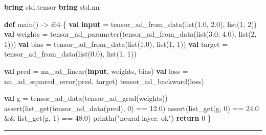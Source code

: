 \documentclass[
  english,
  oneside]{book}
\newenvironment{Shaded}{\begin{snugshade}}{\end{snugshade}}
\newcommand{\ControlFlowTok}[1]{\textcolor[rgb]{0.77,0.53,0.75}{\textbf{#1}}}
\newcommand{\DataTypeTok}[1]{\textcolor[rgb]{0.31,0.79,0.69}{#1}}
\newcommand{\DecValTok}[1]{\textcolor[rgb]{0.71,0.81,0.66}{#1}}
\newcommand{\FloatTok}[1]{\textcolor[rgb]{0.71,0.81,0.66}{#1}}
\newcommand{\FunctionTok}[1]{\textcolor[rgb]{0.86,0.86,0.67}{#1}}
\newcommand{\KeywordTok}[1]{\textcolor[rgb]{0.34,0.61,0.84}{\textbf{#1}}}
\newcommand{\NormalTok}[1]{\textcolor[rgb]{0.83,0.83,0.83}{#1}}
\newcommand{\OperatorTok}[1]{\textcolor[rgb]{0.83,0.83,0.83}{#1}}
\newcommand{\StringTok}[1]{\textcolor[rgb]{0.81,0.57,0.47}{#1}}
\begin{document}
\begin{Shaded}
\begin{Highlighting}[]
\KeywordTok{bring}\NormalTok{ std}\OperatorTok{.}\DataTypeTok{tensor}
\KeywordTok{bring}\NormalTok{ std}\OperatorTok{.}\NormalTok{nn}

\KeywordTok{def}\NormalTok{ main() }\OperatorTok{{-}\textgreater{}} \DataTypeTok{i64}\NormalTok{ \{}
    \KeywordTok{val} \KeywordTok{input} \OperatorTok{=}\NormalTok{ tensor\_ad\_from\_data(}\DataTypeTok{list}\NormalTok{(}\FloatTok{1.0}\NormalTok{, }\FloatTok{2.0}\NormalTok{), }\DataTypeTok{list}\NormalTok{(}\DecValTok{1}\NormalTok{, }\DecValTok{2}\NormalTok{))}
    \KeywordTok{val}\NormalTok{ weights }\OperatorTok{=}\NormalTok{ tensor\_ad\_parameter(tensor\_ad\_from\_data(}\DataTypeTok{list}\NormalTok{(}\FloatTok{3.0}\NormalTok{, }\FloatTok{4.0}\NormalTok{), }\DataTypeTok{list}\NormalTok{(}\DecValTok{2}\NormalTok{, }\DecValTok{1}\NormalTok{)))}
    \KeywordTok{val}\NormalTok{ bias }\OperatorTok{=}\NormalTok{ tensor\_ad\_from\_data(}\DataTypeTok{list}\NormalTok{(}\FloatTok{1.0}\NormalTok{), }\DataTypeTok{list}\NormalTok{(}\DecValTok{1}\NormalTok{, }\DecValTok{1}\NormalTok{))}
    \KeywordTok{val}\NormalTok{ target }\OperatorTok{=}\NormalTok{ tensor\_ad\_from\_data(}\DataTypeTok{list}\NormalTok{(}\FloatTok{0.0}\NormalTok{), }\DataTypeTok{list}\NormalTok{(}\DecValTok{1}\NormalTok{, }\DecValTok{1}\NormalTok{))}

    \KeywordTok{val}\NormalTok{ pred }\OperatorTok{=}\NormalTok{ nn\_ad\_linear(}\KeywordTok{input}\NormalTok{, weights, bias)}
    \KeywordTok{val}\NormalTok{ loss }\OperatorTok{=}\NormalTok{ nn\_ad\_squared\_error(pred, target)}
\NormalTok{    tensor\_ad\_backward(loss)}

    \KeywordTok{val}\NormalTok{ g }\OperatorTok{=}\NormalTok{ tensor\_ad\_data(tensor\_ad\_grad(weights))}
    \FunctionTok{assert}\NormalTok{(}\FunctionTok{list\_get}\NormalTok{(tensor\_ad\_data(pred), }\DecValTok{0}\NormalTok{) }\OperatorTok{==} \FloatTok{12.0}\NormalTok{)}
    \FunctionTok{assert}\NormalTok{(}\FunctionTok{list\_get}\NormalTok{(g, }\DecValTok{0}\NormalTok{) }\OperatorTok{==} \FloatTok{24.0} \OperatorTok{\&\&} \FunctionTok{list\_get}\NormalTok{(g, }\DecValTok{1}\NormalTok{) }\OperatorTok{==} \FloatTok{48.0}\NormalTok{)}
\NormalTok{    println(}\StringTok{"neural layer: ok"}\NormalTok{)}
    \ControlFlowTok{return} \DecValTok{0}
\NormalTok{\}}
\end{Highlighting}
\end{Shaded}

\begin{center}\rule{0.5\linewidth}{0.5pt}\end{center}
\end{document}
